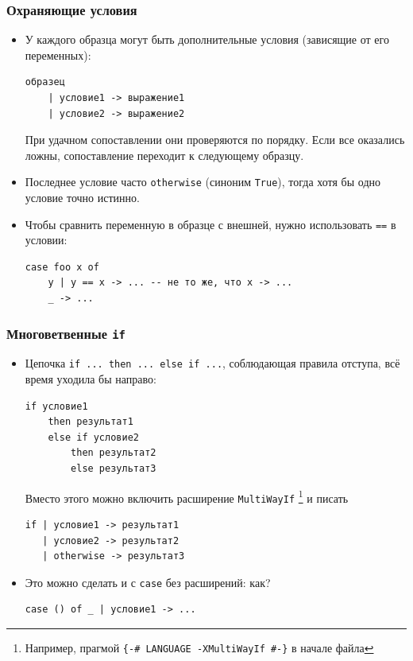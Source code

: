 \documentclass[11pt]{beamer}
\begin{document}
\begin{frame}[fragile]
\frametitle{Охраняющие условия}
\begin{itemize}
    \item У каждого образца могут быть дополнительные условия (зависящие от его переменных): 
\begin{lstlisting}[basicstyle=\ttfamily\scriptsize]
образец
    | условие1 -> выражение1 
    | условие2 -> выражение2
\end{lstlisting}
При удачном сопоставлении они проверяются по порядку. Если все оказались ложны, сопоставление переходит к следующему образцу.
\item Последнее условие часто \lstinline|otherwise| (синоним \lstinline|True|), тогда хотя бы одно условие точно истинно.
\item Чтобы сравнить переменную в образце с внешней, нужно использовать \lstinline|==| в условии:
\begin{lstlisting}[basicstyle=\ttfamily\scriptsize]
case foo x of
    y | y == x -> ... -- не то же, что x -> ...
    _ -> ...
\end{lstlisting}
\end{itemize}
\end{frame}

\begin{frame}[fragile]
\frametitle{Многоветвенные \lstinline[basicstyle=\ttfamily]|if|}
\begin{itemize}
    \item Цепочка \lstinline|if ... then ... else if ...|, соблюдающая правила отступа, всё время уходила бы направо:
\begin{lstlisting}[basicstyle=\ttfamily\scriptsize]
if условие1
    then результат1
    else if условие2
        then результат2
        else результат3
\end{lstlisting}
    Вместо этого можно включить расширение \lstinline|MultiWayIf| \cprotect\footnote{Например, прагмой \lstinline|{-# LANGUAGE -XMultiWayIf #-}| в начале файла} и писать
\begin{lstlisting}[basicstyle=\ttfamily\scriptsize]
if | условие1 -> результат1
   | условие2 -> результат2
   | otherwise -> результат3
\end{lstlisting}
\item Это можно сделать и с \lstinline|case| без расширений: как? \pause \begin{lstlisting}[basicstyle=\ttfamily\scriptsize]
case () of _ | условие1 -> ...
\end{lstlisting}
\end{itemize}
\end{frame}
\end{document}
